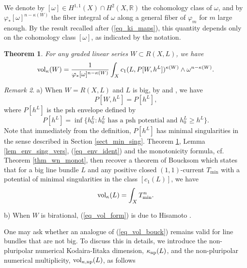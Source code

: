 \documentclass[12pt]{article}
\numberwithin{equation}{section}
\theoremstyle{theorem}
\newtheorem{thm}{Theorem}[section]
\theoremstyle{definition}
\theoremstyle{remark}
\newtheorem{rem}[thm]{Remark}
\newcommand{\real}{\mathbb{R}}
\begin{document}
	We denote by $[\omega] \in H^{1, 1}(X) \cap H^2(X, \real)$ the cohomology class of $\omega$, and by $\varphi_{*} [\omega]^{n - \kappa(W)}$  the fiber integral of $\omega$ along a general fiber of $\varphi_m$ for $m$ large enough.
	By the result recalled after (\ref{eq_ki_maps}), this quantity depends only on the cohomology class $[\omega]$, as indicated by the notation.
	\begin{thm}\label{thm_vol_form}
		For any graded linear series $W \subset R(X, L)$, we have
		\begin{equation}\label{eq_vol_form}
			{\rm{vol}}_{\kappa}(W)
			=
			\frac{1}{\varphi_{*} [\omega]^{n - \kappa(W)}} \int_X c_1(L, P[W, h^L])^{\kappa(W)} \wedge \omega^{n - \kappa(W)}.
		\end{equation}
	\end{thm}
	\begin{rem}
		a)
		When $W = R(X, L)$ and $L$ is big, by \cite{SiciakExtremal} and \cite[Theorem 2.16]{FinGQBig}, we have
		\begin{equation}\label{eq_env_ident}
			P[W, h^L] = P[h^L],
		\end{equation}
		where $P[h^L]$ is the psh envelope defined by
		\begin{equation}\label{eq_sic_env}
			P[h^L]
			=
			\inf \Big\{ h^L_0 : h^L_0 \text{ has a psh potential and } h^L_0 \geq h^L
			\Big\}.
		\end{equation}
		Note that immediately from the definition, $P[h^L]$ has minimal singularities in the sense described in Section \ref{sect_min_sing}.
		Theorem \ref{thm_vol_form}, Lemma \ref{lem_env_sing_vers}, (\ref{eq_env_ident}) and the monotonicity formula, cf. Theorem \ref{thm_wn_monot}, then recover a theorem of Boucksom \cite{BouckVol} which states that for a big line bundle $L$ and any positive closed $(1, 1)$-current $T_{\min}$ with a potential of minimal singularities in the class $[c_1(L)]$, we have
		\begin{equation}\label{eq_vol_bouck}
			{\rm{vol}}_{\kappa}(L) = \int_X T_{\min}^n.
		\end{equation}
		\par 
		b) When $W$ is birational, (\ref{eq_vol_form}) is due to Hisamoto \cite{HisamVolume}.
	\end{rem}
	\par 
	One may ask whether an analogue of (\ref{eq_vol_bouck}) remains valid for line bundles that are not big.	
	To discuss this in details, we introduce the non-pluripolar numerical Kodaira-Iitaka dimension, $\kappa_{{\rm{np}}}(L)$, and the non-pluripolar numerical multiplicity, ${\rm{vol}}_{\kappa, {\rm{np}}}(L)$, as follows
\end{document}
